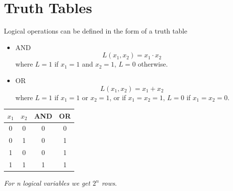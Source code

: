 \documentclass[12pt,openany]{book}
\begin{document}
			      	\section{Truth Tables}
			      	Logical operations can be defined in the form of a truth table
			      	\begin{itemize}
			      		\item[] AND
			      		      \begin{equation*}
			      		      	L(x_1, x_2) = x_1 \cdot x_2
			      		      \end{equation*}
			      		      where \( L = 1 \) if \( x_1 = 1 \) and \( x_2 = 1 \), \( L = 0 \) otherwise.
			      		            
			      		\item[] OR
			      		      \begin{equation*}
			      		      	L(x_1, x_2) = x_1 + x_2
			      		      \end{equation*}
			      		      where \( L = 1 \) if \( x_1 = 1 \) or \( x_2 = 1 \), or if \( x_1 = x_2 = 1 \), \( L = 0 \) if \( x_1 = x_2 = 0 \).
			      	\end{itemize}
			      	  
			      	\begin{center}
			      		\begin{tabular}{ c c | c | c }
			      			\( x_1 \) & \( x_2 \) & AND & OR \\
			      			\hline
			      			0         & 0         & 0   & 0  \\
			      			0         & 1         & 0   & 1  \\
			      			1         & 0         & 0   & 1  \\
			      			1         & 1         & 1   & 1  \\
			      			      
			      		\end{tabular}
			      	\end{center}
			      	
			      	
			      	\textit{For n logical variables we get $2^n$ rows}.\newline
			      	\vspace*{-10px}
\end{document}
